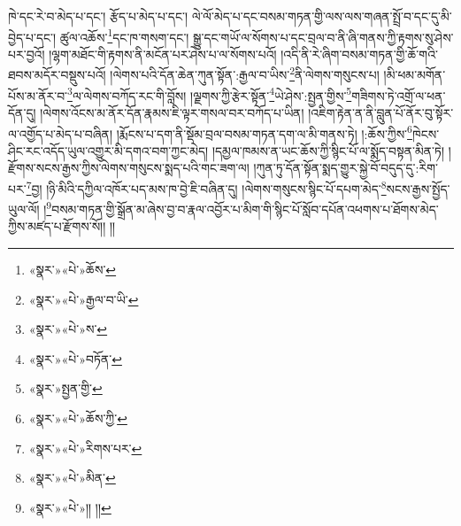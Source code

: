 ཁེ་དང་རེ་བ་མེད་པ་དང་། རྩོད་པ་མེད་པ་དང་། ལེ་ལོ་མེད་པ་དང་བསམ་གཏན་གྱི་ལས་ལས་གཞན་སྤྲོ་བ་དང་དུ་མི་བྱེད་པ་དང་། ཚུལ་འཆོས་\footnote{«སྣར་»«པེ་»ཆོས་}དང་ཁ་གསག་དང་། སྒྱུ་དང་གཡོ་ལ་སོགས་པ་དང་བྲལ་བ་ནི་ཞི་གནས་ཀྱི་རྟགས་སུ་ཤེས་པར་བྱའོ། །ལྷག་མཐོང་གི་རྟགས་ནི་མངོན་པར་ཤེས་པ་ལ་སོགས་པའོ། །འདི་ནི་རེ་ཞིག་བསམ་གཏན་གྱི་ཆོ་གའི་ཐབས་མདོར་བསྡུས་པའོ། །ལེགས་པའི་དོན་ཆེན་ཀུན་སྟོན་:རྒྱལ་བ་ཡིས་\footnote{«སྣར་»«པེ་»རྒྱལ་བ་ཡི་}ནི་ལེགས་གསུངས་པ། །མི་ཕམ་མགོན་པོས་མ་ནོར་བ་\footnote{«སྣར་»«པེ་»ས་}ལ་ལེགས་བཀོད་རང་གི་བློས། །ལྗགས་ཀྱི་རྩེར་སྟོན་\footnote{«སྣར་»«པེ་»བཏོན་}ཡེ་ཤེས་:སྤྱན་གྱིས་\footnote{«སྣར་»སྤྱན་གྱི་}གཟིགས་ཏེ་འགྲོ་ལ་ཕན་དོན་དུ། །ལེགས་འོངས་མ་ནོར་དོན་རྣམས་ཇི་ལྟར་གསལ་བར་བཀོད་པ་ཡིན། །འཇིག་རྟེན་ན་ནི་བླུན་པོ་ནོར་བུ་སྟོར་ལ་འགྱོད་པ་མེད་པ་བཞིན། །རྨོངས་པ་དག་ནི་སྡོམ་བྲལ་བསམ་གཏན་དག་ལ་མི་གནས་ཏེ། །:ཆོས་ཀྱིས་\footnote{«སྣར་»«པེ་»ཆོས་ཀྱི་}ཁེངས་ཤིང་རང་འདོད་ཡུལ་འགྱུར་མི་དགའ་བག་ཀྱང་མེད། །དམྱལ་ཁམས་ན་ཡང་ཆོས་ཀྱི་སྙིང་པོ་ལ་སྨོད་བསྟན་མིན་ཏེ། །རྫོགས་སངས་རྒྱས་ཀྱིས་ལེགས་གསུངས་སྨད་པའི་གང་ཟག་ལ། །ཀུན་ཏུ་དོན་སྟོན་སྨད་གྱུར་སྐྱེ་བོ་བདུད་དུ་:རིག་པར་\footnote{«སྣར་»«པེ་»རིགས་པར་}བྱ། །ཉི་མིའི་དཀྱིལ་འཁོར་པད་མས་ཁ་བྱེ་ཇི་བཞིན་དུ། །ལེགས་གསུངས་སྙིང་པོ་དཔག་མེད་\footnote{«སྣར་»«པེ་»མིན་}སངས་རྒྱས་སྤྱོད་ཡུལ་ལོ། །\footnote{«སྣར་»«པེ་»།། །།}བསམ་གཏན་གྱི་སྒྲོན་མ་ཞེས་བྱ་བ་རྣལ་འབྱོར་པ་མིག་གི་སྙིང་པོ་སློབ་དཔོན་འཕགས་པ་ཐོགས་མེད་ཀྱིས་མཛད་པ་རྫོགས་སོ།། །།